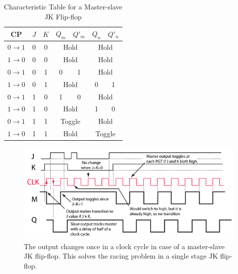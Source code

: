 \begin{table}[H]
    \centering
    \begin{tabular}{|c|c|c|c|c|c|c|}\hline
        CP &$J$ & $K$ & $Q_m$ & $ Q'_m$ & $Q_n$ & $ Q'_n$ \\ \hline
        $0 \rightarrow 1$ & 0 & 0 & \multicolumn{2}{c|}{Hold} & \multicolumn{2}{c|}{Hold} \\ \hline
        $1 \rightarrow 0$ & 0 & 0 & \multicolumn{2}{c|}{Hold} & \multicolumn{2}{c|}{Hold} \\ \hline
        $0 \rightarrow 1$ & 0 & 1 & 0 & 1 & \multicolumn{2}{c|}{Hold} \\ \hline
        $1 \rightarrow 0$ & 0 & 1 & \multicolumn{2}{c|}{Hold} & 0 & 1 \\ \hline
        $0 \rightarrow 1$ & 1 & 0 & 1 & 0 & \multicolumn{2}{c|}{Hold}\\ \hline
        $1 \rightarrow 0$ & 1 & 0 & \multicolumn{2}{c|}{Hold} & 1 & 0\\ \hline
        $0 \rightarrow 1$ & 1 & 1 & \multicolumn{2}{c|}{Toggle} & \multicolumn{2}{c|}{Hold} \\\hline
        $1 \rightarrow 0$ & 1 & 1 & \multicolumn{2}{c|}{Hold} & \multicolumn{2}{c|}{Toggle} \\ \hline
    \end{tabular}
    \caption{Characteristic Table for a Master-slave JK Flip-flop}
\end{table}

\begin{figure}[H]
    \centering
    \includegraphics[width=1\columnwidth]{images/jkrace3.png}
    \caption{The output changes once in a clock cycle in case of a master-slave JK flip-flop. This solves the racing problem in a single stage JK flip-flop.}
    \label{race}
\end{figure}
